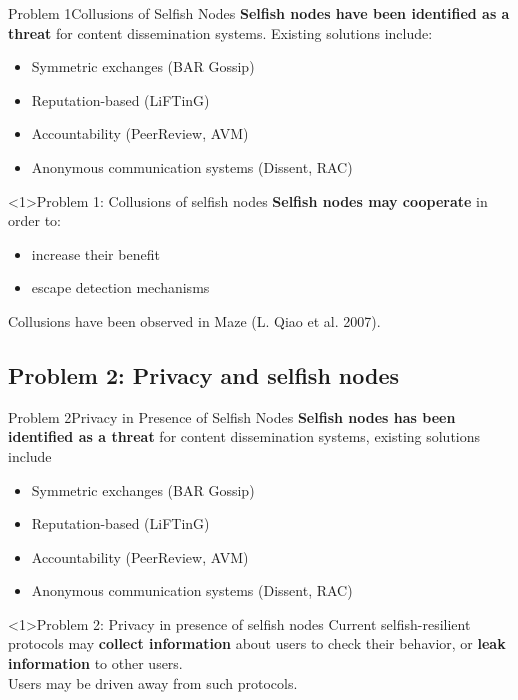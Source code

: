 \documentclass[10pt]{beamer}
\begin{document}
\begin{frame}{Problem 1}{Collusions of Selfish Nodes}
      \textbf{Selfish nodes have been identified as a  threat} for content dissemination systems. Existing solutions include:
         \begin{itemize}
            \item Symmetric exchanges (BAR Gossip)
            \item Reputation-based (LiFTinG)
            \item Accountability (PeerReview, AVM)
            \item Anonymous communication systems (Dissent, RAC)
         \end{itemize}

  \begin{block}<1>{Problem 1: Collusions of selfish nodes}
     \textbf{Selfish nodes may cooperate} in order to:
     \begin{itemize}
        \item increase their benefit 
        \item escape detection mechanisms
     \end{itemize}
     Collusions have been observed in Maze (L. Qiao et al. 2007).
  \end{block}  
\end{frame}

\subsection{Problem 2: Privacy and selfish nodes}

\begin{frame}{Problem 2}{Privacy in Presence of Selfish Nodes}
      \textbf{Selfish nodes has been identified as a threat} for content dissemination systems, existing solutions include
         \begin{itemize}
            \item Symmetric exchanges (BAR Gossip)
            \item Reputation-based (LiFTinG)
            \item Accountability (PeerReview, AVM)
            \item Anonymous communication systems (Dissent, RAC)
         \end{itemize}

  \begin{block}<1>{Problem 2: Privacy in presence of selfish nodes}
     Current selfish-resilient protocols may \textbf{collect information} about users to check their behavior, or \textbf{leak information} to other users. \\
     Users may be driven away from such protocols. 
  \end{block}  
\end{frame}
\end{document}
